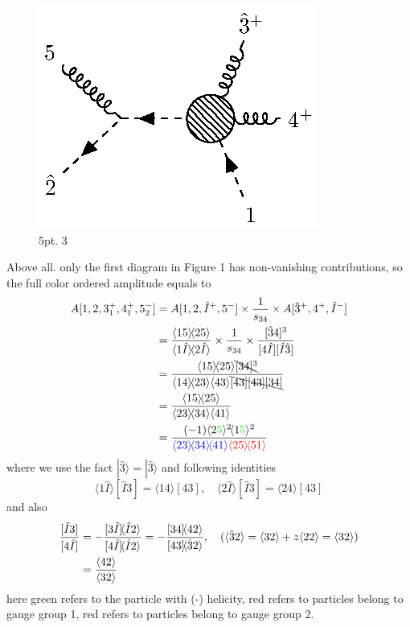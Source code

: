 \documentclass[12pt]{article}
\numberwithin{equation}{section}
\newcommand{\mdavg}[2]{\langle #1 \rangle\!\langle #2 \rangle}
\newcommand{\avg}[1]{\langle #1 \rangle}
\newcommand{\cbrak}[2]{\avg{#1}\![#2]}
\newcommand{\acbrak}[2]{[#1]\!\avg{#2}}
\begin{document}
\begin{figure}[H]
    \centering
    \includegraphics{5pt3.eps}
    \caption{5pt. 3}
    \label{4}
\end{figure}
Above all. only the first diagram in Figure 1 has non-vanishing contributions, so the full color ordered amplitude equals to
\begin{align}
    A[1,2,3_1^+,4_1^+,5_2^-]&=A[1,2,\hat{I}^+,5^-]\times\frac{1}{s_{34}}\times A[\hat{3}^+,4^+,\hat{I}^-]\notag\\
    &=\frac{\mdavg{15}{25}}{\mdavg{1\hat{I}}{2\hat{I}}}\times\frac{1}{s_{34}}\times\frac{[\hat{3}4]^3}{[4\hat{I}][\hat{I}\hat{3}]}\notag\\
    &=\frac{\mdavg{15}{25}\bcancel{[34]^3}}{\mdavg{14}{23}\avg{43}\bcancel{[43][43][34]}}\\
    &=\frac{\mdavg{15}{25}}{\mdavg{23}{34}\avg{41}}\notag\\
    &=\frac{(-1)\avg{2\textcolor{green}{5}}^2\!\avg{1\textcolor{green}{5}}^2}{\textcolor{blue}{\mdavg{23}{34}\!\avg{41}}\textcolor{red}{\mdavg{25}{51}}}
\end{align}
where we use the fact $|\hat{3}\rangle=|\hat{3}\rangle$ and following identities
\begin{equation}
    \cbrak{1\hat{I}}{\hat{I}3}=\cbrak{14}{43},\quad \cbrak{2\hat{I}}{\hat{I}3}=\cbrak{24}{43}
\end{equation}
and also
\begin{align}
    \frac{[\hat{I}3]}{[4\hat{I}]}&=-\frac{\acbrak{3\hat{I}}{\hat{I}2}}{\acbrak{4\hat{I}}{\hat{I}2}}=-\frac{\acbrak{34}{42}}{\acbrak{43}{\hat{3}2}},\quad(\avg{\hat{3}2}=\avg{32}+z\avg{22}=\avg{32})\notag\\
    &=\frac{\avg{42}}{\avg{32}}
\end{align}
here green refers to the particle with (-) helicity, red refers to particles belong to gauge group 1, red refers to particles belong to gauge group 2.
\end{document}
